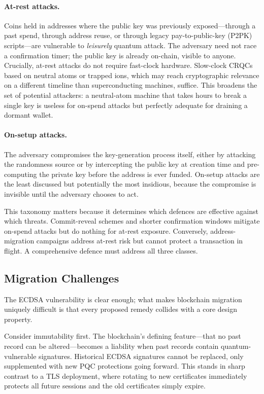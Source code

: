 \paragraph{At-rest attacks.}  Coins held in addresses where the public key was previously exposed---through a past spend, through address reuse, or through legacy pay-to-public-key (P2PK) scripts---are vulnerable to \emph{leisurely} quantum attack.  The adversary need not race a confirmation timer; the public key is already on-chain, visible to anyone.  Crucially, at-rest attacks do not require fast-clock hardware.  Slow-clock CRQCs based on neutral atoms or trapped ions, which may reach cryptographic relevance on a different timeline than superconducting machines, suffice.  This broadens the set of potential attackers: a neutral-atom machine that takes hours to break a single key is useless for on-spend attacks but perfectly adequate for draining a dormant wallet.

\paragraph{On-setup attacks.}  The adversary compromises the key-generation process itself, either by attacking the randomness source or by intercepting the public key at creation time and pre-computing the private key before the address is ever funded.  On-setup attacks are the least discussed but potentially the most insidious, because the compromise is invisible until the adversary chooses to act.

This taxonomy matters because it determines which defences are effective against which threats.  Commit-reveal schemes and shorter confirmation windows mitigate on-spend attacks but do nothing for at-rest exposure.  Conversely, address-migration campaigns address at-rest risk but cannot protect a transaction in flight.  A comprehensive defence must address all three classes.

\subsection{Migration Challenges}
\label{subsec:blockchain-migration}

The ECDSA vulnerability is clear enough; what makes blockchain migration uniquely difficult is that every proposed remedy collides with a core design property.

Consider immutability first.  The blockchain's defining feature---that no past record can be altered---becomes a liability when past records contain quantum-vulnerable signatures.  Historical ECDSA signatures cannot be replaced, only supplemented with new PQC protections going forward.  This stands in sharp contrast to a TLS deployment, where rotating to new certificates immediately protects all future sessions and the old certificates simply expire.

